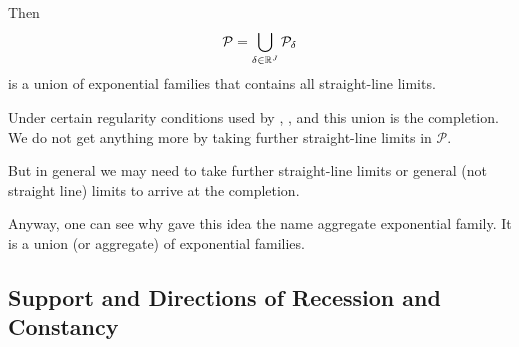 Then
$$
   \mathcal{P} = \bigcup_{\delta \in \mathbb{R}^J} \mathcal{P}_\delta
$$
is a union of exponential families that contains all straight-line limits.

Under certain regularity conditions used by \citet{barndorff-nielsen},
\citet{brown}, and \citet{geyer-gdor} this union is the completion.
We do not get anything more by taking further straight-line limits
in $\mathcal{P}$.

But in general \citep[Chapters~2 and~4]{geyer-thesis} we may need to take
further straight-line limits or general (not straight line) limits
to arrive at the completion.

Anyway, one can see why \citet{brown} gave this idea the name aggregate
exponential family.  It is a union (or aggregate) of exponential families.

\subsection{Support and Directions of Recession and Constancy}

